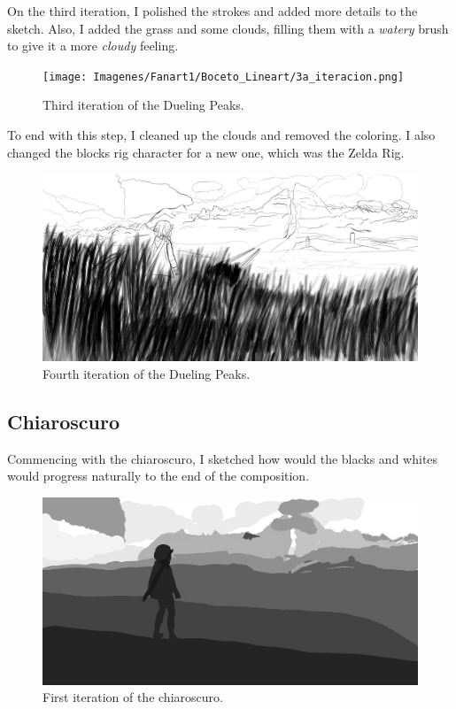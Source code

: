 \documentclass{cup-pan}
\begin{document}
        On the third iteration, I polished the strokes and added more details to the sketch. Also, I added the grass and some clouds, filling them with a \textit{watery} brush to give it a more \textit{cloudy} feeling.\\
        \begin{figure}[H]
            \texttt{[image: Imagenes/Fanart1/Boceto\_Lineart/3a\_iteracion.png]}
            \caption{Third iteration of the Dueling Peaks.}
        \end{figure}

        To end with this step, I cleaned up the clouds and removed the coloring. I also changed the blocks rig character for a new one, which was the Zelda Rig.\\
        \begin{figure}[H]
            \includegraphics[width=\textwidth]{Imagenes/Fanart1/Boceto_Lineart/4a_Iteracion.png}
            \caption{Fourth iteration of the Dueling Peaks.}
        \end{figure}

    \subsection{Chiaroscuro}
        Commencing with the chiaroscuro, I sketched how would the blacks and whites would progress naturally to the end of the composition.
        \begin{figure}[H]
            \includegraphics[width=\textwidth]{Imagenes/Fanart1/Claroscuro/Imagen1.png}
            \caption{First iteration of the chiaroscuro.}
        \end{figure}
\end{document}
